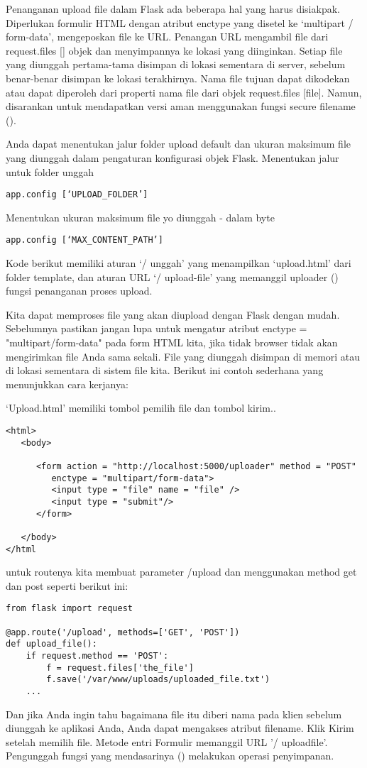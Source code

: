 \documentclass[12pt,a4paper]{article}
\begin{document}
Penanganan upload file dalam Flask ada beberapa hal yang harus disiakpak. Diperlukan formulir HTML dengan atribut enctype yang disetel ke ‘multipart / form-data’, mengeposkan file ke URL. Penangan URL mengambil file dari request.files [] objek dan menyimpannya ke lokasi yang diinginkan.
Setiap file yang diunggah pertama-tama disimpan di lokasi sementara di server, sebelum benar-benar disimpan ke lokasi terakhirnya. Nama file tujuan dapat dikodekan atau dapat diperoleh dari properti nama file dari objek request.files [file]. Namun, disarankan untuk mendapatkan versi aman menggunakan fungsi secure filename ().

Anda dapat menentukan jalur folder upload default dan ukuran maksimum file yang diunggah dalam pengaturan konfigurasi objek Flask.
Menentukan jalur untuk folder unggah
\begin{verbatim}
app.config [‘UPLOAD_FOLDER’] 
\end{verbatim}
Menentukan ukuran maksimum file yo diunggah - dalam byte
\begin{verbatim}
app.config [‘MAX_CONTENT_PATH’] 
\end{verbatim}
Kode berikut memiliki aturan ‘/ unggah’ yang menampilkan ‘upload.html’ dari folder template, dan aturan URL ‘/ upload-file’ yang memanggil uploader () fungsi penanganan proses upload.

Kita dapat memproses file yang akan diupload dengan Flask dengan mudah. Sebelumnya pastikan jangan lupa untuk mengatur atribut enctype = "multipart/form-data" pada form HTML kita, jika tidak browser tidak akan mengirimkan file Anda sama sekali. File yang diunggah disimpan di memori atau di lokasi sementara di sistem file kita. Berikut ini contoh sederhana yang menunjukkan cara kerjanya:

‘Upload.html’ memiliki tombol pemilih file dan tombol kirim..
\begin{verbatim}
<html>
   <body>
   
      <form action = "http://localhost:5000/uploader" method = "POST" 
         enctype = "multipart/form-data">
         <input type = "file" name = "file" />
         <input type = "submit"/>
      </form>
      
   </body>
</html
\end{verbatim}
untuk routenya kita membuat parameter /upload dan menggunakan method get dan post seperti berikut ini:

\begin{verbatim}
from flask import request

@app.route('/upload', methods=['GET', 'POST'])
def upload_file():
    if request.method == 'POST':
        f = request.files['the_file']
        f.save('/var/www/uploads/uploaded_file.txt')
    ...
\end{verbatim}
Dan jika Anda ingin tahu bagaimana file itu diberi nama pada klien sebelum diunggah ke aplikasi Anda, Anda dapat mengakses atribut filename.
Klik Kirim setelah memilih file. Metode entri Formulir memanggil URL '/ uploadfile'. Pengunggah fungsi yang mendasarinya () melakukan operasi penyimpanan.
\end{document}
